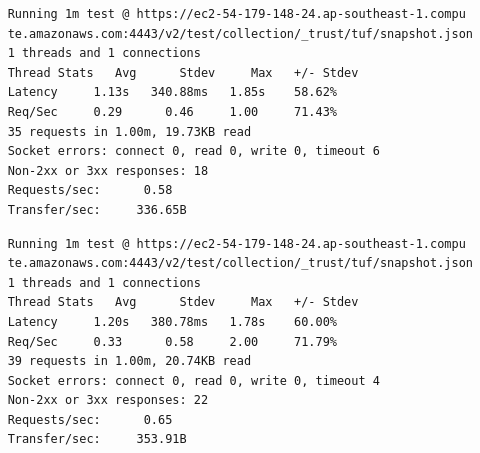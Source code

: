 \documentclass[a4paper,12pt]{article}
\begin{document}
{{	\newpage
	\begin{verbatim}
	Running 1m test @ https://ec2-54-179-148-24.ap-southeast-1.compu
	te.amazonaws.com:4443/v2/test/collection/_trust/tuf/snapshot.json
	1 threads and 1 connections
	Thread Stats   Avg      Stdev     Max   +/- Stdev
	Latency     1.13s   340.88ms   1.85s    58.62%
	Req/Sec     0.29      0.46     1.00     71.43%
	35 requests in 1.00m, 19.73KB read
	Socket errors: connect 0, read 0, write 0, timeout 6
	Non-2xx or 3xx responses: 18
	Requests/sec:      0.58
	Transfer/sec:     336.65B
	\end{verbatim}
	\begin{verbatim}
	Running 1m test @ https://ec2-54-179-148-24.ap-southeast-1.compu
	te.amazonaws.com:4443/v2/test/collection/_trust/tuf/snapshot.json
	1 threads and 1 connections
	Thread Stats   Avg      Stdev     Max   +/- Stdev
	Latency     1.20s   380.78ms   1.78s    60.00%
	Req/Sec     0.33      0.58     2.00     71.79%
	39 requests in 1.00m, 20.74KB read
	Socket errors: connect 0, read 0, write 0, timeout 4
	Non-2xx or 3xx responses: 22
	Requests/sec:      0.65
	Transfer/sec:     353.91B
	\end{verbatim}
	\newpage
	
}}
\end{document}
